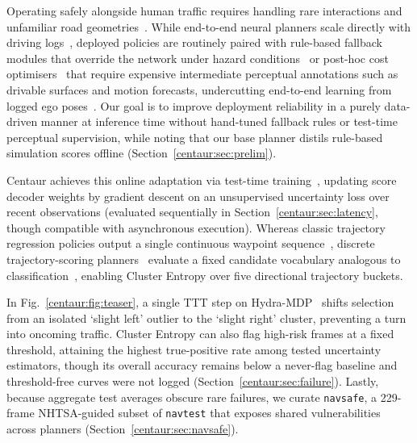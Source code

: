 Operating safely alongside human traffic requires handling rare interactions and unfamiliar road geometries~\cite{shalevshwartz2017rss,liu2024curse}. While end-to-end neural planners scale directly with driving logs~\cite{chitta2023transfuser,hu2023uniad,weng2024paradrive,li2024hydramdp,chen2024e2esurvey,li2023open}, deployed policies are routinely paired with rule-based fallback modules that override the network under hazard conditions~\cite{chitta2023transfuser,vitelli2022safetynet,waywe2024ad2} or post-hoc cost optimisers~\cite{hu2023uniad,Hu2023hoplan} that require expensive intermediate perceptual annotations such as drivable surfaces and motion forecasts, undercutting end-to-end learning from logged ego poses~\cite{Prakash2021transfuser,wu2022tcp}. Our goal is to improve deployment reliability in a purely data-driven manner at inference time without hand-tuned fallback rules or test-time perceptual supervision, while noting that our base planner distils rule-based simulation scores offline (Section~\ref{centaur:sec:prelim}).

Centaur achieves this online adaptation via test-time training~\cite{sun2020ttt,liang2025ttasurvey,wang2022cotta,Gao2024fstta}, updating score decoder weights by gradient descent on an unsupervised uncertainty loss over recent observations (evaluated sequentially in Section~\ref{centaur:sec:latency}, though compatible with asynchronous execution). Whereas classic trajectory regression policies output a single continuous waypoint sequence~\cite{hu2023uniad,chitta2023transfuser,weng2024paradrive,li2024ego}, discrete trajectory-scoring planners~\cite{li2024hydramdp,Sadat2020P3,Casas2021mp3} evaluate a fixed candidate vocabulary analogous to classification~\cite{Gao2024fstta,wang2021tent}, enabling Cluster Entropy over five directional trajectory buckets.

In Fig.~\ref{centaur:fig:teaser}, a single TTT step on Hydra-MDP~\cite{li2024hydramdp} shifts selection from an isolated `slight left' outlier to the `slight right' cluster, preventing a turn into oncoming traffic. Cluster Entropy can also flag high-risk frames at a fixed threshold, attaining the highest true-positive rate among tested uncertainty estimators, though its overall accuracy remains below a never-flag baseline and threshold-free curves were not logged (Section~\ref{centaur:sec:failure}). Lastly, because aggregate test averages obscure rare failures, we curate \texttt{navsafe}, a 229-frame NHTSA-guided subset of \texttt{navtest} that exposes shared vulnerabilities across planners (Section~\ref{centaur:sec:navsafe}).

